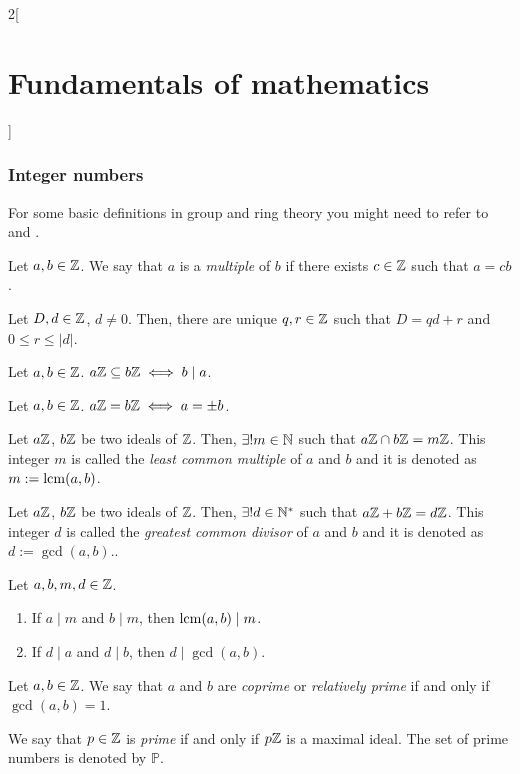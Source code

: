 \documentclass[../../../main_math.tex]{subfiles}
\begin{document}
\begin{multicols}{2}[\section{Fundamentals of mathematics}]
  \subsubsection{Integer numbers}
  For some basic definitions in group and ring theory you might need to refer to  and .
  \begin{definition}
    Let $a,b\in\mathbb{Z}$. We say that $a$ is a \emph{multiple} of $b$ if there exists $c\in\mathbb{Z}$ such that $a=cb$.
  \end{definition}
  \begin{theorem}
    Let $D,d\in\mathbb{Z}$, $d\ne 0$. Then, there are unique $q,r\in\mathbb{Z}$ such that $D=qd+r$ and $0\leq r\leq|d|$.
  \end{theorem}
  \begin{proposition}
    Let $a,b\in \mathbb{Z}$. $a\mathbb{Z}\subseteq b\mathbb{Z}\iff b\mid a$.
  \end{proposition}
  \begin{corollary}
    Let $a,b\in \mathbb{Z}$. $a\mathbb{Z}=b\mathbb{Z}\iff a=\pm b$.
  \end{corollary}
  \begin{proposition}
    Let $a\mathbb{Z}$, $b\mathbb{Z}$ be two ideals of $\mathbb{Z}$. Then, $\exists!m\in\mathbb{N}$ such that $a\mathbb{Z}\cap b\mathbb{Z}=m\mathbb{Z}$. This integer $m$ is called the \emph{least common multiple} of $a$ and $b$ and it is denoted as $m:=\operatorname{lcm}(a,b)$.
  \end{proposition}
  \begin{proposition}
    Let $a\mathbb{Z}$, $b\mathbb{Z}$ be two ideals of $\mathbb{Z}$. Then, $\exists!d\in\mathbb{N}^*$ such that $a\mathbb{Z}+b\mathbb{Z}=d\mathbb{Z}$. This integer $d$ is called the \emph{greatest common divisor} of $a$ and $b$ and it is denoted as $d:=\gcd(a,b)$..
  \end{proposition}
  \begin{proposition}
    Let $a,b,m,d\in\mathbb{Z}$.
    \begin{enumerate}
      \item If $a\mid m$ and $b\mid m$, then $\operatorname{lcm}(a,b)\mid m$.
      \item If $d\mid a$ and $d\mid b$, then $d\mid\gcd(a,b)$.
    \end{enumerate}
  \end{proposition}
  \begin{definition}
    Let $a,b\in\mathbb{Z}$. We say that $a$ and $b$ are \emph{coprime} or \emph{relatively prime} if and only if $\gcd(a,b)=1$.
  \end{definition}
  \begin{definition}
    We say that $p\in\mathbb{Z}$ is \emph{prime} if and only if $p\mathbb{Z}$ is a maximal ideal. The set of prime numbers is denoted by $\mathbb{P}$.

\end{definition}
\end{multicols}
\end{document}
